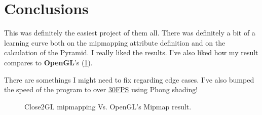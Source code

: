 \documentclass[twocolumn, 12pt]{article}
\begin{document}
\section{Conclusions}
\label{sec:org4b6672f}

This was definitely the easiest project of them all. There was definitely a bit
of a learning curve both on the mipmapping attribute definition and on the
calculation of the Pyramid. I really liked the results. I've also liked how my
result compares to \textbf{OpenGL}'s (\cref{fig:opengl}).

There are somethings I might need to fix regarding edge cases. I've also bumped
the speed of the program to over \uline{30FPS} using Phong shading!

\begingroup
\begin{figure}
\captionsetup[subfigure]{justification=centering}
\centering
\label{fig:opengl}
\caption{Close2GL mipmapping Vs. OpenGL's Mipmap result.}
%
\hspace{0.1em}%
%
\end{figure}
\endgroup
\end{document}
